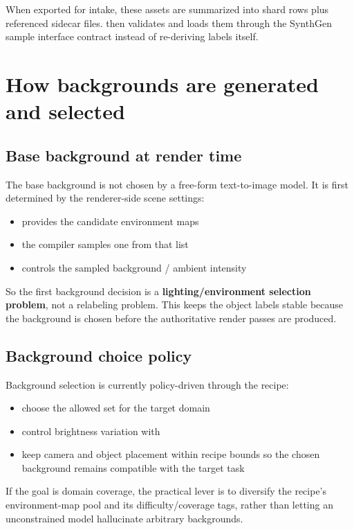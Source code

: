 When exported for \yolozu{} intake, these assets are summarized into shard rows plus referenced sidecar files. \yolozu{} then validates and loads them through the SynthGen sample interface contract instead of re-deriving labels itself.

\section{How backgrounds are generated and selected}

\subsection{Base background at render time}

The base background is not chosen by a free-form text-to-image model. It is first determined by the renderer-side scene settings:
\begin{itemize}
  \item {} provides the candidate environment maps
  \item the compiler samples one  from that list
  \item {} controls the sampled background / ambient intensity
\end{itemize}

So the first background decision is a \textbf{lighting/environment selection problem}, not a relabeling problem. This keeps the object labels stable because the background is chosen before the authoritative render passes are produced.

\subsection{Background choice policy}

Background selection is currently policy-driven through the recipe:
\begin{itemize}
  \item choose the allowed  set for the target domain
  \item control brightness variation with 
  \item keep camera and object placement within recipe bounds so the chosen background remains compatible with the target task
\end{itemize}

If the goal is domain coverage, the practical lever is to diversify the recipe's environment-map pool and its difficulty/coverage tags, rather than letting an unconstrained model hallucinate arbitrary backgrounds.


